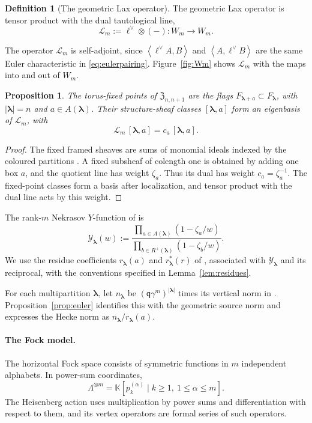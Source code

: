 \documentclass[11pt]{amsart}
\newtheorem{proposition}[theorem]{Proposition}
\theoremstyle{definition}
\newtheorem{definition}[theorem]{Definition}
\theoremstyle{remark}
\newcommand{\Mq}{\mathsf q}                      %
\newcommand{\K}{\mathbb K}                       %
\newcommand{\La}{\Lambda}                        %
\newcommand{\bl}{{\boldsymbol{\lambda}}}         %
\newcommand{\Add}[1]{A(#1)}                      %
\newcommand{\bwt}[1]{\zeta_{#1}}                 %
\newcommand{\CY}{\mathcal Y}
\newcommand{\Yfn}[1]{\CY_{#1}}                   %
\newcommand{\res}[2]{r_{#1}(#2)}                 %
\newcommand{\cores}[2]{r^*_{#1}(#2)}             %
\newcommand{\srcnorm}[1]{n_{#1}}                 %
\newcommand{\ip}[2]{\left\langle #1,#2\right\rangle}
\newcommand{\ceig}[1]{c_{#1}}                    %
\newcommand{\Remp}[1]{R^{+}(#1)}                 %
\newcommand{\Zc}{\mathfrak Z}
\newcommand{\Hecke}[1]{\Zc_{#1,#1+1}}            %
\newcommand{\Sh}{F}                              %
\newcommand{\Fsh}[1]{\Sh_{#1}}                   %
\newcommand{\Wsp}[1]{W_{#1}}                     %
\newcommand{\pt}[2]{[#1,#2]}                     %
\newcommand{\taut}{\ell}                         %
\newcommand{\dtaut}{\taut^{\vee}}                %
\newcommand{\pk}[2]{p_{#1}^{(#2)}}               %
\newcommand{\GLax}[1]{\mathcal L_{#1}}           %
\begin{document}
\begin{definition}[The geometric Lax operator]\label{def:operator}
The geometric Lax operator is tensor product with the dual tautological line,
\[
 \GLax{m}:=\dtaut\otimes(-)\colon\Wsp{m}\to\Wsp{m}.
\]
\end{definition}

The operator \(\GLax{m}\) is self-adjoint, since
\(\ip{\dtaut A}{B}\) and \(\ip{A}{\dtaut B}\) are the same Euler characteristic in
\eqref{eq:eulerpairing}. Figure~\ref{fig:Wm}
shows \(\GLax{m}\) with the maps into and out of \(\Wsp{m}\).

\begin{proposition}
\label{prop:fixed}
The torus-fixed points of \(\Hecke{n}\) are the flags
\(\Fsh{\bl+a}\subset\Fsh{\bl}\), with \(|\bl|=n\) and \(a\in\Add{\bl}\).
Their structure-sheaf classes \(\pt{\bl}{a}\) form an eigenbasis of \(\GLax{m}\), with
\[
 \GLax{m}\,\pt{\bl}{a}=\ceig{a}\,\pt{\bl}{a}.
\]
\end{proposition}

\begin{proof}
The fixed framed sheaves are sums of monomial ideals indexed by the coloured partitions
\cite[Sections~5.2--5.3]{N1}. A fixed subsheaf of colength one is obtained by adding one
box \(a\), and the quotient line has weight \(\bwt{a}\).
Thus its dual has weight \(\ceig{a}=\bwt{a}^{-1}\). The fixed-point classes form a basis
after localization, and tensor product with the dual line acts by this weight.
\end{proof}

The rank-\(m\) Nekrasov \(Y\)-function of \cite{BCS} is
\[
 \Yfn{\bl}(w):=\frac{\prod_{a\in\Add{\bl}}(1-\bwt{a}/w)}
                  {\prod_{b\in\Remp{\bl}}(1-\bwt{b}/w)}.
\]
We use the residue coefficients \(\res{\bl}{a}\) and \(\cores{\bl}{r}\) of
\cite{BCS}, associated with \(\Yfn{\bl}\) and its reciprocal, with the
conventions specified in Lemma~\ref{lem:residues}.

For each multipartition \(\bl\), let \(\srcnorm{\bl}\) be
\((\Mq\gamma^m)^{|\bl|}\) times its vertical norm in \cite[(2.25)]{BCS}.
Proposition~\ref{prop:euler} identifies this with the geometric source norm
and expresses the Hecke norm as \(\srcnorm{\bl}/\res{\bl}{a}\).

\paragraph{The Fock model.}

The horizontal Fock space consists of symmetric functions in \(m\) independent
alphabets. In power-sum coordinates,
\[
 \La^{\otimes m}=\K[\pk{k}{\alpha}\mid k\geq1,\ 1\leq\alpha\leq m].
\]
The Heisenberg action uses multiplication by power sums and differentiation
with respect to them, and its vertex operators are formal series of such operators.
\end{document}
